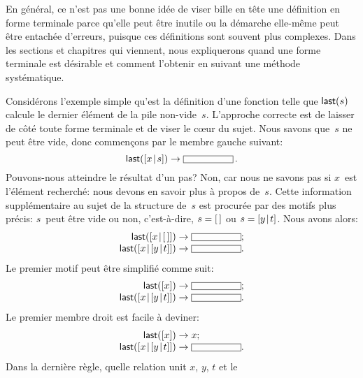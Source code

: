 En général, ce n'est pas une bonne idée de viser bille en tête une
définition en forme terminale parce qu'elle peut être inutile ou la
démarche elle-même peut être entachée d'erreurs, puisque ces
définitions sont souvent plus complexes. Dans les sections et
chapitres qui viennent, nous expliquerons quand une forme terminale
est désirable et comment l'obtenir en suivant une méthode
systématique.

Considérons l'exemple simple qu'est la définition d'une fonction
 telle que \(\textsf{last}(s)\) calcule le dernier élément de
la pile non-vide~\(s\). L'approche correcte est de laisser de côté
toute forme terminale et de viser le cœur du sujet. Nous savons
que~\(s\) ne peut être vide, donc commençons par le membre gauche suivant:
\begin{equation*}
\fun{last}(\cons{x}{s}) \rightarrow \fbcode{CCCCCCC}\,.
\end{equation*}
Pouvons-nous atteindre le résultat d'un pas? Non, car nous ne savons
pas si \(x\)~est l'élément recherché: nous devons en savoir plus à
propos de~\(s\). Cette information supplémentaire au sujet de la
structure de~\(s\) est procurée par des motifs plus précis: \(s\)~peut
être vide ou non, c'est-à-dire, \(s = [\,]\) ou \(s=[{y}\!\mid\!{t}]\). Nous
avons alors:
\begin{equation*}
\begin{array}{r@{\;}c@{\;}l}
\fun{last}(\cons{x}{\el}) & \rightarrow & \fbcode{CCCCCCC};\\
\fun{last}(\cons{x}{\cons{y}{t}}) & \rightarrow & \fbcode{CCCCCCC}.
\end{array}
\end{equation*}
Le premier motif peut être simplifié comme suit:
\begin{equation*}
\begin{array}{r@{\;}c@{\;}l}
\fun{last}([x]) & \rightarrow & \fbcode{CCCCCCC};\\
\fun{last}(\cons{x}{\cons{y}{t}}) & \rightarrow & \fbcode{CCCCCCC}.
\end{array}
\end{equation*}
Le premier membre droit est facile à deviner:
\begin{equation*}
\begin{array}{r@{\;}c@{\;}l}
\fun{last}([x]) & \rightarrow & x;\\
\fun{last}(\cons{x}{\cons{y}{t}}) & \rightarrow & \fbcode{CCCCCCC}.
\end{array}
\end{equation*}
Dans la dernière règle, quelle relation unit \(x\), \(y\), \(t\) et le
